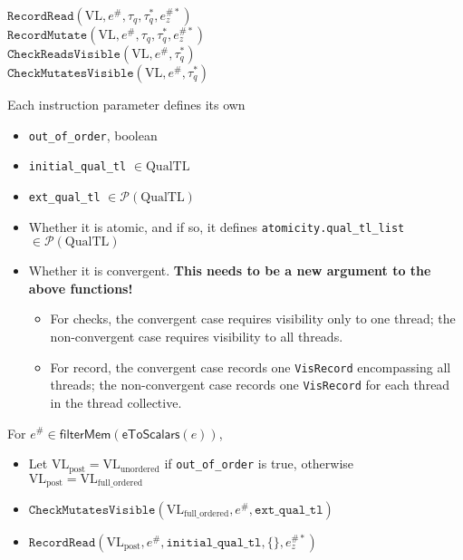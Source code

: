 




$\texttt{RecordRead}(\mathrm{VL}, e^\#, \tau_q, \tau_q^*, e_z^{\#*})$ \\
$\texttt{RecordMutate}(\mathrm{VL}, e^\#, \tau_q, \tau_q^*, e_z^{\#*})$\\
$\texttt{CheckReadsVisible}(\mathrm{VL}, e^\#, \tau_q^*)$\\
$\texttt{CheckMutatesVisible}(\mathrm{VL}, e^\#, \tau_q^*)$

Each instruction parameter defines its own
\begin{itemize}
  \item \texttt{out\_of\_order}, boolean
  \item \texttt{initial\_qual\_tl} $\in \mathrm{QualTL}$
  \item \texttt{ext\_qual\_tl} $\in \mathcal{P}(\mathrm{QualTL})$
  \item Whether it is atomic, and if so, it defines \texttt{atomicity.qual\_tl\_list} $\in \mathcal{P}(\mathrm{QualTL})$
  \item Whether it is convergent.
    \textbf{This needs to be a new argument to the above functions!}
    \begin{itemize}
      \item For checks, the convergent case requires visibility only to one thread; the non-convergent case requires visibility to all threads.
      \item For record, the convergent case records one \texttt{VisRecord} encompassing all threads; the non-convergent case records one \texttt{VisRecord} for each thread in the thread collective.
    \end{itemize}
\end{itemize}


For $e^\# \in \mathsf{filterMem}(\mathsf{eToScalars}(e))$,
\begin{itemize}
  \item Let $\mathrm{VL_{post}} = \mathrm{VL_{unordered}}$ if \texttt{out\_of\_order} is true, otherwise $\mathrm{VL_{post}} = \mathrm{VL_{full\_ordered}}$
  \item $\texttt{CheckMutatesVisible}(\mathrm{VL_{full\_ordered}}, e^\#, \texttt{ext\_qual\_tl})$
  \item $\texttt{RecordRead}(\mathrm{VL_{post}}, e^\#, \texttt{initial\_qual\_tl}, \{\}, e_z^{\#*})$
\end{itemize}

